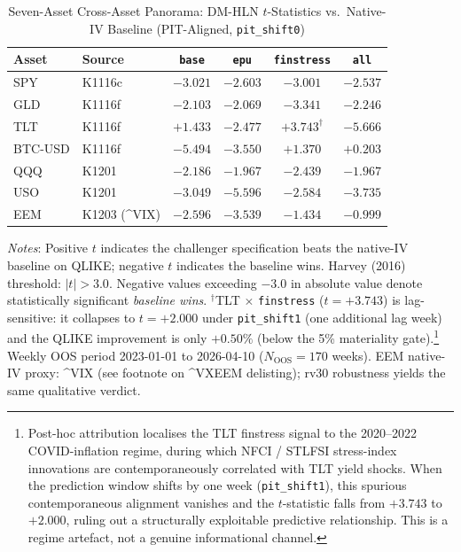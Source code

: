 \documentclass[12pt,a4paper]{article}
\begin{document}
\begin{table}[H]
\centering
\small
\begin{threeparttable}
\caption{Seven-Asset Cross-Asset Panorama: DM-HLN $t$-Statistics vs.\ Native-IV Baseline (PIT-Aligned, \texttt{pit\_shift0})}
\label{tab:panorama_7asset}
\begin{tabular}{@{}llcccc@{}}
\toprule
Asset & Source & \texttt{base} & \texttt{epu} & \texttt{finstress} & \texttt{all} \\
\midrule
SPY     & K1116c          & $-3.021$ & $-2.603$ & $-3.001$           & $-2.537$ \\
GLD     & K1116f          & $-2.103$ & $-2.069$ & $-3.341$           & $-2.246$ \\
TLT     & K1116f          & $+1.433$ & $-2.477$ & $+3.743^{\dag}$    & $-5.666$ \\
BTC-USD & K1116f          & $-5.494$ & $-3.550$ & $+1.370$           & $+0.203$ \\
QQQ     & K1201           & $-2.186$ & $-1.967$ & $-2.439$           & $-1.967$ \\
USO     & K1201           & $-3.049$ & $-5.596$ & $-2.584$           & $-3.735$ \\
EEM     & K1203 (\^{}VIX) & $-2.596$ & $-3.539$ & $-1.434$           & $-0.999$ \\
\bottomrule
\end{tabular}
\begin{tablenotes}
\small
\item \textit{Notes}: Positive $t$ indicates the challenger specification beats the native-IV baseline on QLIKE; negative $t$ indicates the baseline wins. Harvey (2016) threshold: $|t| > 3.0$. Negative values exceeding $-3.0$ in absolute value denote statistically significant \emph{baseline wins}. $^{\dag}$TLT $\times$ \texttt{finstress} ($t = +3.743$) is lag-sensitive: it collapses to $t = +2.000$ under \texttt{pit\_shift1} (one additional lag week) and the QLIKE improvement is only $+0.50\%$ (below the 5\% materiality gate).\footnote{Post-hoc attribution localises the TLT finstress signal to the 2020--2022 COVID-inflation regime, during which NFCI / STLFSI stress-index innovations are contemporaneously correlated with TLT yield shocks. When the prediction window shifts by one week (\texttt{pit\_shift1}), this spurious contemporaneous alignment vanishes and the $t$-statistic falls from $+3.743$ to $+2.000$, ruling out a structurally exploitable predictive relationship. This is a regime artefact, not a genuine informational channel.} Weekly OOS period 2023-01-01 to 2026-04-10 ($N_{\text{OOS}} = 170$ weeks). EEM native-IV proxy: \^{}VIX (see footnote on \^{}VXEEM delisting); rv30 robustness yields the same qualitative verdict.
\end{tablenotes}
\end{threeparttable}
\end{table}
\end{document}
